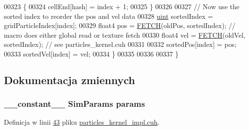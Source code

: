 \begin{DoxyCode}
00323         \{
00324             cellEnd[hash] = index + 1;
00325         \}
00326 
00327         \textcolor{comment}{// Now use the sorted index to reorder the pos and vel data}
00328         \hyperlink{particles__kernel_8cuh_a91ad9478d81a7aaf2593e8d9c3d06a14}{uint} sortedIndex = gridParticleIndex[index];
00329         float4 pos = \hyperlink{particles__kernel_8cuh_a12269d678a65f18889c2a7e98c756457}{FETCH}(oldPos, sortedIndex);       \textcolor{comment}{// macro does either global read or texture
       fetch}
00330         float4 vel = \hyperlink{particles__kernel_8cuh_a12269d678a65f18889c2a7e98c756457}{FETCH}(oldVel, sortedIndex);       \textcolor{comment}{// see particles\_kernel.cuh}
00331 
00332         sortedPos[index] = pos;
00333         sortedVel[index] = vel;
00334     \}
00335 
00336 
00337 \}
\end{DoxyCode}


\subsection{Dokumentacja zmiennych}
\hypertarget{particles__kernel__impl_8cuh_a8db8938e28edd17862daf58651051bdc}{
\subsubsection[{params}]{\setlength{\rightskip}{0pt plus 5cm}\-\_\-\-\_\-constant\-\_\-\-\_\- {\bf Sim\-Params} params}}\label{particles__kernel__impl_8cuh_a8db8938e28edd17862daf58651051bdc}


Definicja w linii \hyperlink{particles__kernel__impl_8cuh_source_l00043}{43} pliku \hyperlink{particles__kernel__impl_8cuh_source}{particles\-\_\-kernel\-\_\-impl.\-cuh}.

